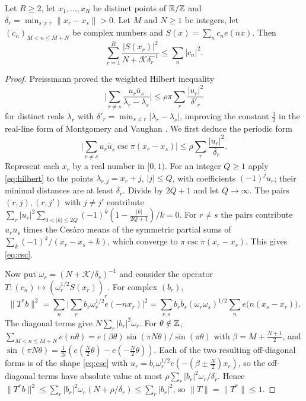 \documentclass[11pt,colorlinks]{charlie}
\newcommand{\Ka}{\mathcal K}
\begin{document}
\begin{lemma}\label{lem:largesieve}
Let $R\ge2$, let $x_1,\dots,x_R$ be distinct points of $\mathbb{R}/\mathbb{Z}$ and $\delta_r=\min_{s\ne r}\|x_r-x_s\|>0$. Let $M$ and $N\ge1$ be integers, let $(c_n)_{M<n\le M+N}$ be complex numbers and $S(x)=\sum_nc_ne(nx)$. Then
\[
 \sum_{r=1}^R\frac{|S(x_r)|^2}{N+\Ka\delta_r^{-1}}\le\sum_n|c_n|^2 .
\]
\end{lemma}
\begin{proof}
Preissmann \cite{Preissmann} proved the weighted Hilbert inequality
\begin{equation}\label{eq:hilbert}
 \Big|\sum_{r\ne s}\frac{u_r\bar u_s}{\lambda_r-\lambda_s}\Big|\le\rho\pi\sum_r\frac{|u_r|^2}{\delta'_r}
\end{equation}
for distinct reals $\lambda_r$ with $\delta'_r=\min_{s\ne r}|\lambda_r-\lambda_s|$, improving the constant $\frac32$ in the real-line form of Montgomery and Vaughan \cite[Theorem~2, (1.7)]{MVH}. We first deduce the periodic form
\begin{equation}\label{eq:csc}
 \Big|\sum_{r\ne s}u_r\bar u_s\csc\pi(x_r-x_s)\Big|\le\rho\sum_r\frac{|u_r|^2}{\delta_r}.
\end{equation}
Represent each $x_r$ by a real number in $[0,1)$. For an integer $Q\ge1$ apply \eqref{eq:hilbert} to the points $\lambda_{r,j}=x_r+j$, $|j|\le Q$, with coefficients $(-1)^ju_r$; their minimal distances are at least $\delta_r$. Divide by $2Q+1$ and let $Q\to\infty$. The pairs $(r,j),(r,j')$ with $j\ne j'$ contribute $\sum_r|u_r|^2\sum_{0<|k|\le2Q}(-1)^k(1-\frac{|k|}{2Q+1})/k=0$. For $r\ne s$ the pairs contribute $u_r\bar u_s$ times the Ces\`aro means of the symmetric partial sums of $\sum_k(-1)^k/(x_r-x_s+k)$, which converge to $\pi\csc\pi(x_r-x_s)$. This gives \eqref{eq:csc}.

Now put $\omega_r=(N+\Ka/\delta_r)^{-1}$ and consider the operator $T:(c_n)\mapsto(\omega_r^{1/2}S(x_r))_r$. For complex $(b_r)$,
\[
 \|T^*b\|^2=\sum_n\Big|\sum_rb_r\omega_r^{1/2}e(-nx_r)\Big|^2=\sum_{r,s}b_r\bar b_s(\omega_r\omega_s)^{1/2}\sum_ne\big(n(x_s-x_r)\big).
\]
The diagonal terms give $N\sum_r|b_r|^2\omega_r$. For $\theta\notin\mathbb{Z}$, $\sum_{M<n\le M+N}e(n\theta)=e(\beta\theta)\sin(\pi N\theta)/\sin(\pi\theta)$ with $\beta=M+\frac{N+1}2$, and $\sin(\pi N\theta)=\frac1{2i}(e(\frac N2\theta)-e(-\frac N2\theta))$. Each of the two resulting off-diagonal forms is of the shape \eqref{eq:csc} with $u_r=b_r\omega_r^{1/2}e(-(\beta\pm\frac N2)x_r)$, so the off-diagonal terms have absolute value at most $\rho\sum_r|b_r|^2\omega_r/\delta_r$. Hence $\|T^*b\|^2\le\sum_r|b_r|^2\omega_r(N+\rho/\delta_r)\le\sum_r|b_r|^2$, so $\|T\|=\|T^*\|\le1$.
\end{proof}
\end{document}
